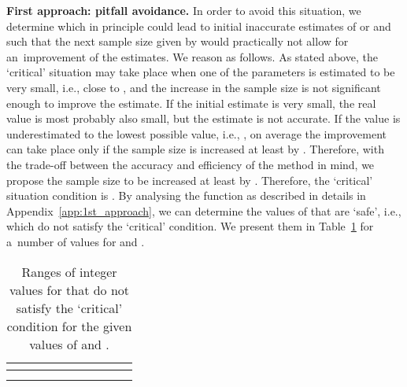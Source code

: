 \documentclass[runningheads,a4paper]{llncs}
\begin{document}
\medskip
\noindent
{\bf First approach: pitfall avoidance.}
In order to avoid this situation, we determine  which in principle could lead to initial
inaccurate estimates of  or  and such that the next sample size given by  would practically not allow for an~improvement of the estimates. We reason
as follows. As stated above, the `critical' situation may take place when one of the parameters is
estimated to be very small, i.e., close to , and the increase in the sample size is
not significant enough to improve the estimate. If the initial estimate is very small, the real
value is most probably also small, but the estimate is not accurate. If the value is
underestimated to the lowest possible value, i.e., , on average the improvement can
take place only if the sample size is increased at least by . Therefore, with the trade-off
between the accuracy and efficiency of the method in mind, we propose the sample size to be
increased at least by . Therefore, the `critical' situation condition is
. By analysing the function  as described in details in
Appendix~\ref{app:1st_approach}, we can determine the values of  that are `safe', i.e.,
which do not satisfy the `critical' condition. We present them in Table~\ref{tab:n_0} for a~number
of values for  and .



\begin{table}[t]
  \centering
  \begin{tabular}{|c|c|c|c|c|c|c|c|c|c|}
  \hline
   & \multicolumn{3}{c|}{} & \multicolumn{3}{c|}{} &
   \multicolumn{3}{c|}{}\\
  \hline
   &  &  &  &  &  &  &  &  & \\
  \hline
   &  &  &  &  &  &  &
    &  & \\
  \hline
  \end{tabular}
  \caption{Ranges of integer values for  that
  do not satisfy the `critical' condition 
for the given values of  and .}\label{tab:n_0}
\end{table}
\end{document}
